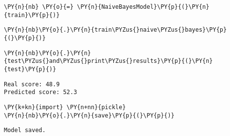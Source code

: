     \begin{tcolorbox}[breakable, size=fbox, boxrule=1pt, pad at break*=1mm,colback=cellbackground, colframe=cellborder]
\begin{Verbatim}[commandchars=\\\{\}]
\PY{n}{nb} \PY{o}{=} \PY{n}{NaiveBayesModel}\PY{p}{(}\PY{n}{train}\PY{p}{)}
\end{Verbatim}
\end{tcolorbox}

    \begin{tcolorbox}[breakable, size=fbox, boxrule=1pt, pad at break*=1mm,colback=cellbackground, colframe=cellborder]
\begin{Verbatim}[commandchars=\\\{\}]
\PY{n}{nb}\PY{o}{.}\PY{n}{train\PYZus{}naive\PYZus{}bayes}\PY{p}{(}\PY{p}{)}
\end{Verbatim}
\end{tcolorbox}

    \begin{tcolorbox}[breakable, size=fbox, boxrule=1pt, pad at break*=1mm,colback=cellbackground, colframe=cellborder]
\begin{Verbatim}[commandchars=\\\{\}]
\PY{n}{nb}\PY{o}{.}\PY{n}{test\PYZus{}and\PYZus{}print\PYZus{}results}\PY{p}{(}\PY{n}{test}\PY{p}{)}
\end{Verbatim}
\end{tcolorbox}

    \begin{Verbatim}[commandchars=\\\{\}]
Real score: 48.9
Predicted score: 52.3
    \end{Verbatim}

    \begin{tcolorbox}[breakable, size=fbox, boxrule=1pt, pad at break*=1mm,colback=cellbackground, colframe=cellborder]
\begin{Verbatim}[commandchars=\\\{\}]
\PY{k+kn}{import} \PY{n+nn}{pickle}
\PY{n}{nb}\PY{o}{.}\PY{n}{save}\PY{p}{(}\PY{p}{)}
\end{Verbatim}
\end{tcolorbox}

    \begin{Verbatim}[commandchars=\\\{\}]
Model saved.
    \end{Verbatim}

